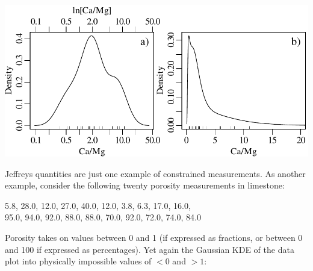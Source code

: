 \noindent\begin{minipage}[t][][b]{.6\textwidth}
  \includegraphics[width=\textwidth]{../figures/logKDE.pdf}\\
\end{minipage}
\begin{minipage}[t][][t]{.4\textwidth}
  \label{fig:logKDE}
\end{minipage}

Jeffreys quantities are just one example of constrained measurements.
As another example, consider the following twenty porosity
measurements in limestone:\\

\begin{center}
  5.8, 28.0, 12.0, 27.0, 40.0, 12.0, 3.8, 6.3, 17.0, 16.0,\\
  95.0, 94.0, 92.0, 88.0, 88.0, 70.0, 92.0, 72.0, 74.0, 84.0
\end{center}

Porosity takes on values between 0 and 1 (if expressed as fractions,
or between 0 and 100 if expressed as percentages). Yet again the
Gaussian KDE of the data plot into physically impossible values of
$<0$ and $>1$:\\

